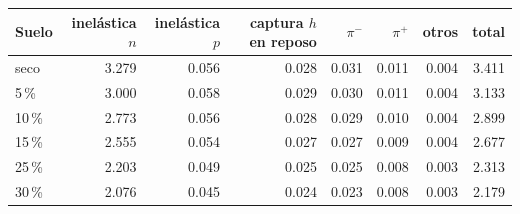 \begin{tabular}{lrrrrrrr}
\toprule
Suelo & inelástica $n$ & inelástica $p$ & captura $h$ en reposo & $\pi^-$ & $\pi^+$ & otros & total \\
\midrule
seco & 3.279 & 0.056 & 0.028 & 0.031 & 0.011 & 0.004 & 3.411 \\
5\,\% & 3.000 & 0.058 & 0.029 & 0.030 & 0.011 & 0.004 & 3.133 \\
10\,\% & 2.773 & 0.056 & 0.028 & 0.029 & 0.010 & 0.004 & 2.899 \\
15\,\% & 2.555 & 0.054 & 0.027 & 0.027 & 0.009 & 0.004 & 2.677 \\
25\,\% & 2.203 & 0.049 & 0.025 & 0.025 & 0.008 & 0.003 & 2.313 \\
30\,\% & 2.076 & 0.045 & 0.024 & 0.023 & 0.008 & 0.003 & 2.179 \\
\bottomrule
\end{tabular}
